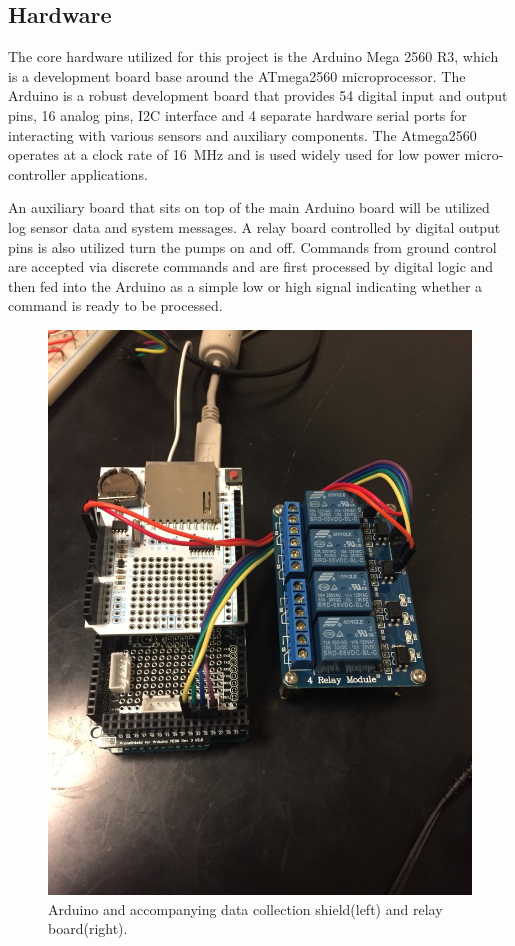 \documentclass{article}
\begin{document}
\subsection{Hardware}

The core hardware utilized for this project is the Arduino Mega 2560 R3, which is a development board base around the ATmega2560 microprocessor. The Arduino is a robust development board that provides 54 digital input and output pins, 16 analog pins, I2C interface and 4 separate hardware serial ports for interacting with various sensors and auxiliary components. The Atmega2560 operates at a clock rate of \SI{16}{\mega\hertz} and is used widely used for low power micro-controller applications.

An auxiliary board that sits on top of the main Arduino board will be utilized log sensor data and system messages. A relay board controlled by digital output pins is also utilized turn the pumps on and off. Commands from ground control are accepted via discrete commands and are first processed by digital logic and then fed into the Arduino as a simple low or high signal indicating whether a command is ready to be processed.

\begin{figure}[H]
\centering
        \includegraphics[scale=.25]{flight_computer.jpg}
    \caption{Arduino and accompanying data collection shield(left) and relay board(right).}
    \label{fig:flight}
\end{figure}
\end{document}
